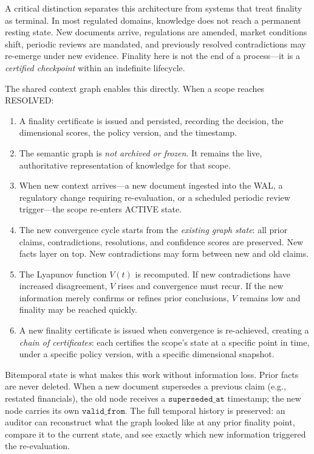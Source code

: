 \documentclass[11pt]{article}
\begin{document}
A critical distinction separates this architecture from systems that treat finality as terminal. In most regulated domains, knowledge does not reach a permanent resting state. New documents arrive, regulations are amended, market conditions shift, periodic reviews are mandated, and previously resolved contradictions may re-emerge under new evidence. Finality here is not the end of a process---it is a \emph{certified checkpoint} within an indefinite lifecycle.

The shared context graph enables this directly. When a scope reaches RESOLVED:

\begin{enumerate}
  \item A finality certificate is issued and persisted, recording the decision, the dimensional scores, the policy version, and the timestamp.
  \item The semantic graph is \emph{not archived or frozen}. It remains the live, authoritative representation of knowledge for that scope.
  \item When new context arrives---a new document ingested into the WAL, a regulatory change requiring re-evaluation, or a scheduled periodic review trigger---the scope re-enters ACTIVE state.
  \item The new convergence cycle starts from the \emph{existing graph state}: all prior claims, contradictions, resolutions, and confidence scores are preserved. New facts layer on top. New contradictions may form between new and old claims.
  \item The Lyapunov function $V(t)$ is recomputed. If new contradictions have increased disagreement, $V$ rises and convergence must recur. If the new information merely confirms or refines prior conclusions, $V$ remains low and finality may be reached quickly.
  \item A new finality certificate is issued when convergence is re-achieved, creating a \emph{chain of certificates}: each certifies the scope's state at a specific point in time, under a specific policy version, with a specific dimensional snapshot.
\end{enumerate}

Bitemporal state is what makes this work without information loss. Prior facts are never deleted. When a new document supersedes a previous claim (e.g., restated financials), the old node receives a $\texttt{superseded\_at}$ timestamp; the new node carries its own $\texttt{valid\_from}$. The full temporal history is preserved: an auditor can reconstruct what the graph looked like at any prior finality point, compare it to the current state, and see exactly which new information triggered the re-evaluation.
\end{document}
